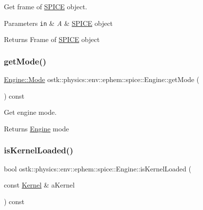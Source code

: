 Get frame of \hyperlink{classostk_1_1physics_1_1env_1_1ephem_1_1_s_p_i_c_e}{S\+P\+I\+CE} object. 


\begin{DoxyParams}[1]{Parameters}
\mbox{\tt in}  & {\em A} & \hyperlink{classostk_1_1physics_1_1env_1_1ephem_1_1_s_p_i_c_e}{S\+P\+I\+CE} object \\
\hline
\end{DoxyParams}
\begin{DoxyReturn}{Returns}
Frame of \hyperlink{classostk_1_1physics_1_1env_1_1ephem_1_1_s_p_i_c_e}{S\+P\+I\+CE} object 
\end{DoxyReturn}
\mbox{\label{classostk_1_1physics_1_1env_1_1ephem_1_1spice_1_1_engine_af7d9d424721bc7bc9d634c00699c897c}} 
\subsubsection{\texorpdfstring{get\+Mode()}{getMode()}}
{\footnotesize\ttfamily \hyperlink{classostk_1_1physics_1_1env_1_1ephem_1_1spice_1_1_engine_a803b82d8f41c81e861852098b6b75ae2}{Engine\+::\+Mode} ostk\+::physics\+::env\+::ephem\+::spice\+::\+Engine\+::get\+Mode (\begin{DoxyParamCaption}{ }\end{DoxyParamCaption}) const}



Get engine mode. 

\begin{DoxyReturn}{Returns}
\hyperlink{classostk_1_1physics_1_1env_1_1ephem_1_1spice_1_1_engine}{Engine} mode 
\end{DoxyReturn}
\mbox{\label{classostk_1_1physics_1_1env_1_1ephem_1_1spice_1_1_engine_aeb4efb8c50f73b90083ebd7d8a5e317f}} 
\subsubsection{\texorpdfstring{is\+Kernel\+Loaded()}{isKernelLoaded()}}
{\footnotesize\ttfamily bool ostk\+::physics\+::env\+::ephem\+::spice\+::\+Engine\+::is\+Kernel\+Loaded (\begin{DoxyParamCaption}\item[{const \hyperlink{classostk_1_1physics_1_1env_1_1ephem_1_1spice_1_1_kernel}{Kernel} \&}]{a\+Kernel }\end{DoxyParamCaption}) const}



